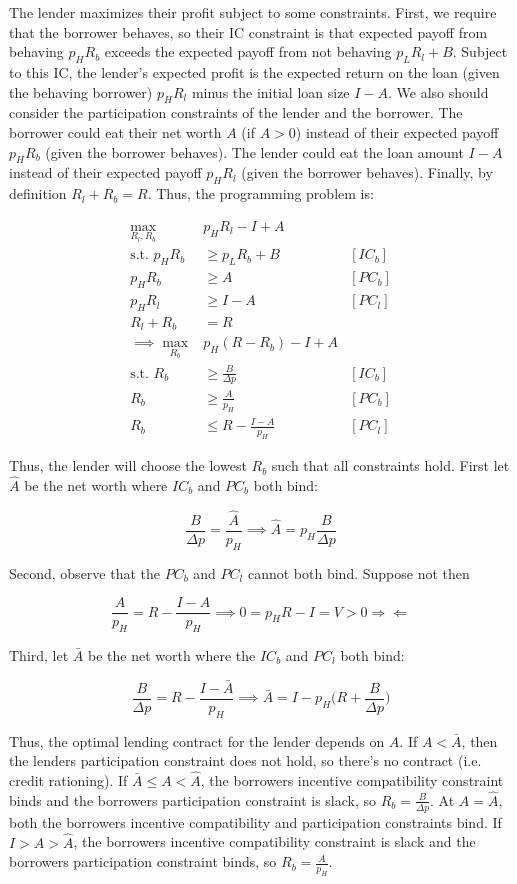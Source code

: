 \documentclass{article}
\begin{document}
The lender maximizes their profit subject to some constraints. First, we require that the borrower behaves, so their IC constraint is that expected payoff from behaving $p_HR_b$ exceeds the expected payoff from not behaving $p_L R_l + B$.  Subject to this IC, the lender's expected profit is the expected return on the loan (given the behaving borrower) $p_H R_l$ minus the initial loan size $I - A$. We also should consider the participation constraints of the lender and the borrower.  The borrower could eat their net worth $A$ (if $A > 0$) instead of their expected payoff $p_H R_b$ (given the borrower behaves).  The lender could eat the loan amount $I - A$ instead of their expected payoff $p_H R_l$  (given the borrower behaves).  Finally, by definition $R_l + R_b = R$.  Thus, the programming problem is:

\begin{align*}
\max_{R_l, R_b} & p_H R_l - I + A & \\
\text{s.t. }  
p_H R_b &\ge p_L R_b + B & [IC_b] \\
p_H R_b &\ge A & [PC_b] \\
p_H R_l &\ge I - A & [PC_l] \\
R_l + R_b &= R & \\
\implies 
\max_{R_b} & p_H (R - R_b) - I + A & \\
\text{s.t. }  
R_b &\ge \frac{B}{\Delta p} & [IC_b] \\
R_b &\ge \frac{A}{p_H} & [PC_b] \\
R_b &\le R - \frac{I - A}{p_H} & [PC_l]
\end{align*}

Thus, the lender will choose the lowest $R_b$ such that all constraints hold.  First let $\hat{A}$ be the net worth where $IC_b$ and $PC_b$ both bind:

$$
\frac{B}{\Delta p} = \frac{\hat{A}}{p_H} 
\implies
\hat{A} = p_H \frac{B}{\Delta p}
$$

Second, observe that the $PC_b$ and $PC_l$ cannot both bind.  Suppose not then

$$
\frac{A}{p_H} = R - \frac{I - A}{p_H} \implies 0 = p_H R - I = V > 0 \Rightarrow \Leftarrow
$$

Third, let $\bar{A}$ be the net worth where the $IC_b$ and $PC_l$ both bind:

$$
\frac{B}{\Delta p} = R - \frac{I - \bar{A}}{p_H} 
\implies 
\bar{A} = I - p_H \Bigg(R + \frac{B}{\Delta p} \Bigg)  
$$

Thus, the optimal lending contract for the lender depends on $A$.  If $A < \bar{A}$, then the lenders participation constraint does not hold, so there's no contract (i.e. credit rationing).  If $\bar{A} \le A < \hat{A}$, the borrowers incentive compatibility constraint binds and the borrowers participation constraint is slack, so $R_b = \frac{B}{\Delta p}$.  At $A = \hat{A}$, both the borrowers incentive compatibility and participation constraints bind. If $I > A > \hat{A}$, the borrowers incentive compatibility constraint is slack and the borrowers participation constraint binds, so $R_b = \frac{A}{p_H}$.
\end{document}
